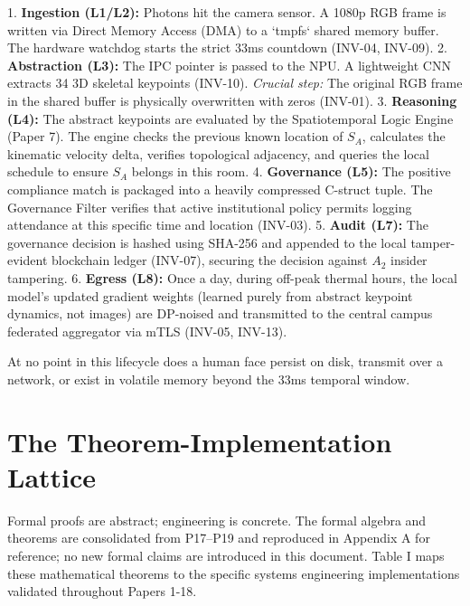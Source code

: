 \documentclass[conference]{IEEEtran}
\theoremstyle{definition}
\begin{document}
1. \textbf{Ingestion (L1/L2):} Photons hit the camera sensor. A 1080p RGB frame is written via Direct Memory Access (DMA) to a `tmpfs` shared memory buffer. The hardware watchdog starts the strict 33ms countdown (INV-04, INV-09).
2. \textbf{Abstraction (L3):} The IPC pointer is passed to the NPU. A lightweight CNN extracts 34 3D skeletal keypoints (INV-10). \textit{Crucial step:} The original RGB frame in the shared buffer is physically overwritten with zeros (INV-01).
3. \textbf{Reasoning (L4):} The abstract keypoints are evaluated by the Spatiotemporal Logic Engine (Paper 7). The engine checks the previous known location of $S_A$, calculates the kinematic velocity delta, verifies topological adjacency, and queries the local schedule to ensure $S_A$ belongs in this room.
4. \textbf{Governance (L5):} The positive compliance match is packaged into a heavily compressed C-struct tuple. The Governance Filter verifies that active institutional policy permits logging attendance at this specific time and location (INV-03).
5. \textbf{Audit (L7):} The governance decision is hashed using SHA-256 and appended to the local tamper-evident blockchain ledger (INV-07), securing the decision against $A_2$ insider tampering.
6. \textbf{Egress (L8):} Once a day, during off-peak thermal hours, the local model's updated gradient weights (learned purely from abstract keypoint dynamics, not images) are DP-noised and transmitted to the central campus federated aggregator via mTLS (INV-05, INV-13).

At no point in this lifecycle does a human face persist on disk, transmit over a network, or exist in volatile memory beyond the 33ms temporal window.

\section{The Theorem-Implementation Lattice}
Formal proofs are abstract; engineering is concrete. The formal algebra and theorems are consolidated from P17–P19 and reproduced in Appendix A for reference; no new formal claims are introduced in this document. Table I maps these mathematical theorems to the specific systems engineering implementations validated throughout Papers 1-18.
\end{document}
